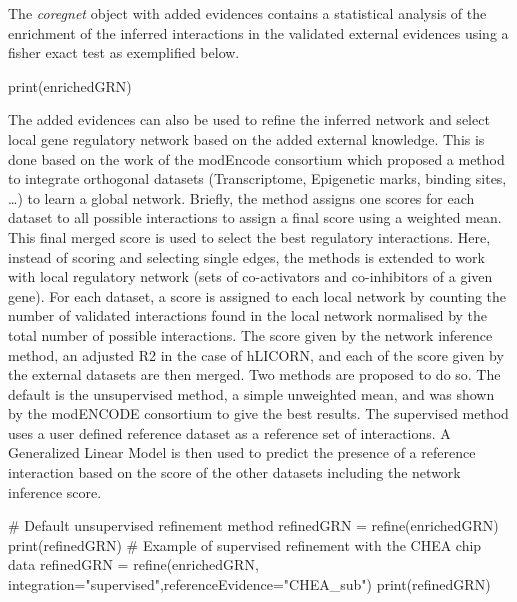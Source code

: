 \documentclass[12pt]{article}
\begin{document}
The \textit{coregnet} object with added evidences contains a statistical
analysis of the enrichment of the inferred interactions in the validated
external evidences using a fisher exact test as exemplified below.
    
    \begin{Schunk}
\begin{Sinput}
    print(enrichedGRN)
    
    \end{Sinput}
\end{Schunk}

The added evidences can also be used to refine the inferred network and
select local gene regulatory network based on the added external
knowledge. This is done based on the work of the modEncode consortium
which proposed a method to integrate orthogonal datasets (Transcriptome,
Epigenetic marks, binding sites, \ldots) to learn a global network.
Briefly, the method assigns one scores for each dataset to all possible
interactions to assign a final score using a weighted mean. This final
merged score is used to select the best regulatory interactions. Here,
instead of scoring and selecting single edges, the methods is extended
to work with local regulatory network (sets of co-activators and
co-inhibitors of a given gene). For each dataset, a score is assigned to
each local network by counting the number of validated interactions
found in the local network normalised by the total number of possible
interactions. The score given by the network inference method, an
adjusted R2 in the case of hLICORN, and each of the score given by the
external datasets are then merged. Two methods are proposed to do so.
The default is the unsupervised method, a simple unweighted mean, and
was shown by the modENCODE consortium to give the best results. The
supervised method uses a user defined reference dataset as a reference
set of interactions. A Generalized Linear Model is then used to predict
the presence of a reference interaction based on the score of the other
datasets including the network inference score.


\begin{Schunk}
\begin{Sinput}
        # Default unsupervised refinement method
    refinedGRN = refine(enrichedGRN)
    print(refinedGRN)
    # Example of supervised refinement with the CHEA chip data
    refinedGRN = refine(enrichedGRN, integration="supervised",referenceEvidence="CHEA_sub")
    print(refinedGRN)
    \end{Sinput}
\end{Schunk}
\end{document}
